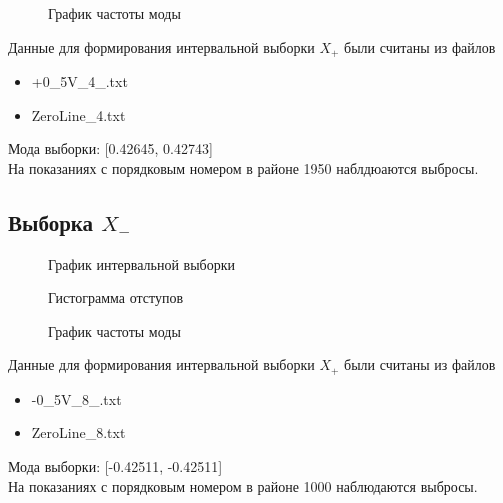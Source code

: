 \documentclass[12pt,a4paper]{article}
\begin{document}
                \begin{figure}[h!]
                        \caption{График частоты моды}
                \end{figure}
                \FloatBarrier
                
                Данные для формирования интервальной выборки $X_+$ были считаны из файлов 
                \begin{itemize}
                    \item +0\_5V\_4\_.txt
                    \item ZeroLine\_4.txt
                \end{itemize}
                Мода выборки: [0.42645, 0.42743]\\
                На показаниях с порядковым номером в районе 1950 наблдюаются выбросы.
            
		\subsection{Выборка $X_-$}
                \begin{figure}[h!]
                        \caption{График интервальной выборки}
                \end{figure}
                \FloatBarrier
                
                \begin{figure}[h!]                            
                        \caption{Гистограмма отступов}
                \end{figure}
                \FloatBarrier
                
                \begin{figure}[h!]
                        \caption{График частоты моды}
                \end{figure}
                \FloatBarrier

                Данные для формирования интервальной выборки $X_+$ были считаны из файлов 
                \begin{itemize}
                    \item -0\_5V\_8\_.txt
                    \item ZeroLine\_8.txt
                \end{itemize}
                Мода выборки: [-0.42511, -0.42511]\\
                На показаниях с порядковым номером в районе 1000 наблюдаются выбросы.
\end{document}
